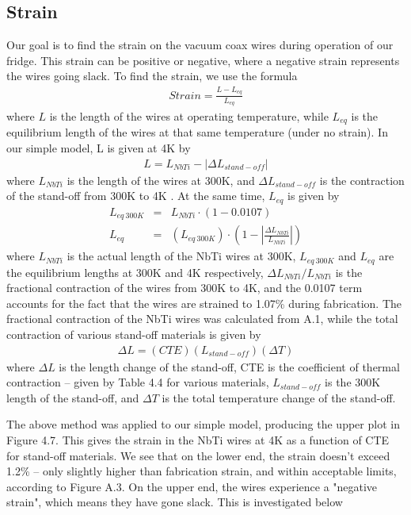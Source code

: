 \documentclass{report}
\begin{document}
\subsection{Strain}
Our goal is to find the strain on the vacuum coax wires during operation of our fridge. This strain can be positive or negative, where a negative strain represents the wires going slack. To find the strain, we use the formula
\begin{eqnarray}
Strain = \frac{L - L_{eq}}{L_{eq}}
\end{eqnarray}
where $L$ is the length of the wires at operating temperature, while $L_{eq}$ is the equilibrium length of the wires at that same temperature (under no strain). In our simple model, L is given at 4K by
\begin{eqnarray}
L = L_{NbTi} - |\Delta L_{stand-off}|
\end{eqnarray}
where $L_{NbTi}$ is the length of the wires at 300K, and $\Delta L_{stand-off}$ is the contraction of the stand-off from 300K to 4K \footnotemark. At the same time, $L_{eq}$ is given by
\begin{eqnarray}
L_{eq \ 300K} & = & L_{NbTi} \cdot (1 - 0.0107) \\
L_{eq} & = & (L_{eq \ 300K})\cdot\left(1 - \left|\frac{\Delta L_{NbTi}}{L_{NbTi}}\right|\right)
\end{eqnarray}
where $L_{NbTi}$ is the actual length of the NbTi wires at 300K, $L_{eq \ 300K}$ and $L_{eq}$ are the equilibrium lengths at 300K and 4K respectively, $\Delta L_{NbTi}/L_{NbTi}$ is the fractional contraction of the wires from 300K to 4K, and the 0.0107 term accounts for the fact that the wires are strained to 1.07\% during fabrication. The fractional contraction of the NbTi wires was calculated from A.1, while the total contraction of various stand-off materials is given by
\begin{eqnarray}
\Delta L = (CTE)(L_{stand-off})(\Delta T)
\end{eqnarray}
where $\Delta L$ is the length change of the stand-off, CTE is the coefficient of thermal contraction -- given by Table 4.4 for various materials, $L_{stand-off}$ is the 300K length of the stand-off, and $\Delta T$ is the total temperature change of the stand-off.


The above method was applied to our simple model, producing the upper plot in Figure 4.7. This gives the strain in the NbTi wires at 4K as a function of CTE for stand-off materials. We see that on the lower end, the strain doesn't exceed 1.2\% -- only slightly higher than fabrication strain, and within acceptable limits, according to Figure A.3. On the upper end, the wires experience a "negative strain", which means they have gone slack. This is investigated below
\end{document}
